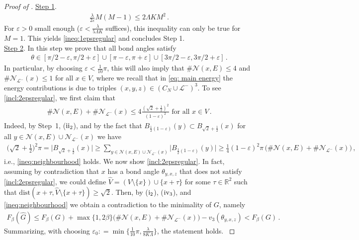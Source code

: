 \documentclass[reqno]{amsart}
\theoremstyle{plain}
\newenvironment{step}[1]{\underline{Step #1}.}{}
\theoremstyle{definition}
\numberwithin{equation}{section}
\begin{document}
\begin{proof}[Proof of ]
\begin{step}{1}
\begin{align*}
\frac{\lambda  }{2\varepsilon}M(M-1)  \leq 2 \Lambda K M^2\,.
\end{align*}
For $\varepsilon>0$ small enough ($\varepsilon < \frac{\lambda}{5\Lambda K  }  $ suffices), this inequality can only be true for $M=1$. This yields \eqref{ineq:1epsregular} and concludes Step 1.
\end{step} \\
\noindent \begin{step}{2} In this step we prove that all bond angles satisfy 
\begin{align}\label{incl:2epsregular}
\theta \in [\pi/2-\varepsilon,\pi/2+\varepsilon] \cup [\pi-\varepsilon,\pi+\varepsilon] \cup [3\pi/2-\varepsilon,3\pi/2+\varepsilon]\,.
\end{align}
In particular, by choosing $\varepsilon< \frac{1}{10}\pi$, this will also imply that $\#\mathcal{N}(x,E) \leq 4$ and $\# \mathcal{N}_{\mathcal{L}^-}(x) \le 1$ for all $x \in V$,  where we recall that in \eqref{eq: main energy} the energy contributions is due to triples $(x,y,z) \in  \left(C_N\cup\mathcal{L}^-\right)^3$. To see \eqref{incl:2epsregular}, we   first    claim that 
\begin{align}\label{ineq:neighbourhood}
\#\mathcal{N}(x,E) + \# \mathcal{N}_{\mathcal{L}^-}(x) \leq 4\frac{\left(\sqrt{2} +\frac{1}{2}\right)^2}{(1-\varepsilon)^2} \text{ for all } x\in V\,.
\end{align} 
Indeed,  by Step~1,  {\rm ($\rm{ii}_2$)}, and by the fact that $B_{\frac{1}{2}(1-\varepsilon)}(y) \subset B_{\sqrt{2}+\frac{1}{2}}(x)$ for all $y \in \mathcal{N}(x,E) \cup \mathcal{N}_{\mathcal{L}^-}(x) $ we have
\begin{align*}
\big(\sqrt{2} +\tfrac{1}{2}\big)^2\pi = \big| B_{\sqrt{2}+\frac{1}{2}}(x)\big| \geq \sum_{y \in \mathcal{N}(x,E) \cup \mathcal{N}_{\mathcal{L}^-}(x)  } \big|B_{\frac{1}{2}(1-\varepsilon)}(y)\big| \geq  \frac{1}{4}(1-\varepsilon)^2 \pi\, \big(\# \mathcal{N}(x,E) + \# \mathcal{N}_{\mathcal{L}^-}(x)  \big) \,,
\end{align*} 
i.e., \eqref{ineq:neighbourhood} holds. We now show  \eqref{incl:2epsregular}. In fact,  assuming by contradiction that  $x$ has a bond angle $\theta_{y,x,z}$ that does not satisfy \eqref{incl:2epsregular}, we could define $\hat{V}= (V\setminus \{x\} )\cup \{x+\tau\}$ for some $\tau \in \mathbb{R}^2$ such that $\mathrm{dist}(x+\tau, \hat{V}\setminus \{x+\tau\})\geq \sqrt{2}$. Then, by  {($\rm i_2$)}, {($\rm iv_3$)}, and \eqref{ineq:neighbourhood}  we obtain a contradiction to the minimality of $G$, namely
\begin{align*}
F_\beta(\hat{G}) \leq F_\beta(G) + \max\{1,  2\beta\}  \big( \#\mathcal{N}(x,E)  + \# \mathcal{N}_{\mathcal{L}^-}(x)  \big)- v_3(\theta_{y,x,z}) <F_\beta(G)\,.
\end{align*}
 Summarizing, with choosing $\varepsilon_0 : = \min\{\frac{1}{10}\pi,  \frac{\lambda}{8K\Lambda}  \}$,  the statement holds. 
\end{step}
 \end{proof}
\end{document}

